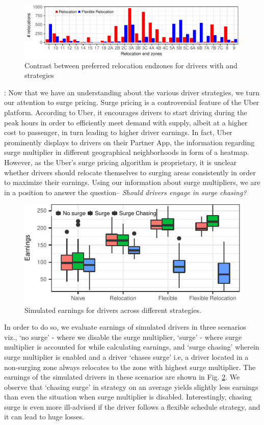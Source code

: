 \begin{figure}
	\centering
	\includegraphics{figures/relocation_endzones.pdf}
	\caption{Contrast between preferred relocation endzones for drivers with 
	{\relocation} and {\relocationflexible} strategies}
	\label{fig:relocation_endzones}
\end{figure}

:
Now that we have an understanding about the various driver strategies, we turn our attention to surge pricing. Surge pricing is a controversial feature of the Uber platform. According to Uber, it encourages drivers to start driving during the peak hours in order to efficiently meet demand with supply, albeit at a higher cost to passenger, in turn leading to higher driver earnings. In fact, Uber prominently displays to drivers on their Partner App, the information regarding surge multiplier in different geographical neighborhoods in form of a heatmap. However, as the Uber's surge pricing algorithm is proprietary, it is unclear whether drivers should relocate themselves to surging areas consistently in order to maximize their earnings. Using our information about surge multipliers, we are in a position to answer the question-- \textit{Should drivers engage in surge chasing?}
\begin{figure}[H]
	\includegraphics{figures/simulated_earnings.pdf}
	\caption{Simulated earnings for drivers across different strategies.}
	\label{fig:simulated_earnings}
\end{figure}
In order to do so, we evaluate earnings of simulated drivers in three scenarios viz., `no surge' - where we disable the surge multiplier, `surge' - where surge multiplier is accounted for while calculating earnings, and `surge chasing' wherein surge multiplier is enabled and a driver `chases surge' i.e, a driver located in a non-surging zone always relocates to the zone with highest surge multiplier. The earnings of the simulated drivers in these scenarios are shown in Fig. {\ref{fig:simulated_earnings}}. We observe that `chasing surge' in {\naive} strategy on an average yields slightly less earnings than even the situation when surge multiplier is disabled. Interestingly, chasing surge is even more ill-advised if the driver follows a flexible schedule strategy, and it can lead to huge losses.

